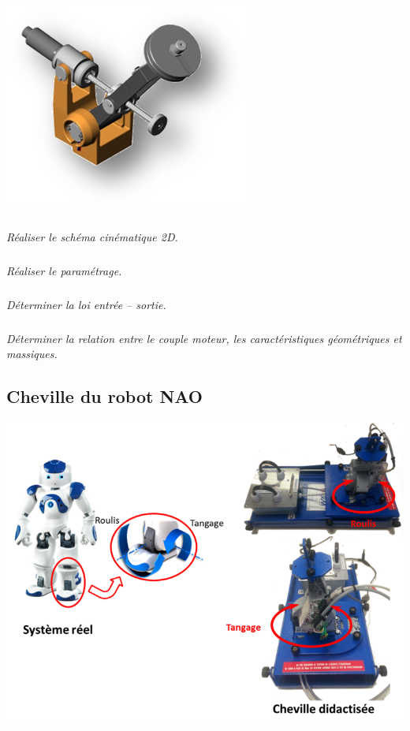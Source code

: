 \documentclass[10pt,fleqn]{article} %
\begin{document}
\begin{multicols}{2}
\setcounter{exo}{0}
\begin{center}
\includegraphics[width=\linewidth]{images/maxpid_01}
\end{center}

\subparagraph{}
\textit{Réaliser le schéma cinématique 2D.}

\subparagraph{}
\textit{Réaliser le paramétrage.}


\subparagraph{}
\textit{Déterminer la loi entrée -- sortie.}

\subparagraph{}
\textit{Déterminer la relation entre le couple moteur, les caractéristiques géométriques et massiques. }



\subsection*{Cheville du robot NAO}


\setcounter{exo}{0}
\begin{center}
\includegraphics[width=\linewidth]{images/nao_02}
\end{center}


\end{multicols}
\end{document}

